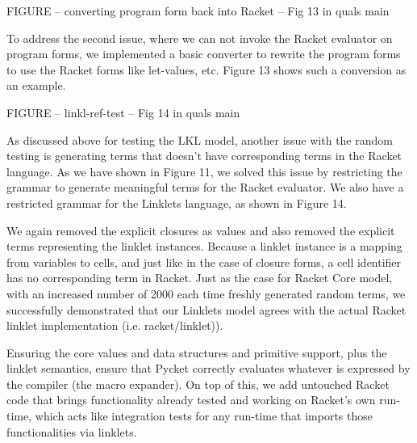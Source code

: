			\begin{figure-here}
				FIGURE -- converting program form back into Racket -- Fig 13 in quals main
			\end{figure-here}

			\begin{paragraph-here}%
				To address the second issue, where we can not invoke the Racket evaluator on program forms, we implemented a basic converter to rewrite the program forms to use the Racket forms like let-values, etc. Figure 13 shows such a conversion as an example.

			\end{paragraph-here}

			\begin{figure-here}
				 FIGURE -- linkl-ref-test -- Fig 14 in quals main
			\end{figure-here}

			\begin{paragraph-here}%
				As discussed above for testing the LKL model, another issue with the random testing is generating terms that doesn’t have corresponding terms in the Racket language. As we have shown in Figure 11, we solved this issue by restricting the grammar to generate meaningful terms for the Racket evaluator. We also have a restricted grammar for the Linklets language, as shown in Figure 14.
			\end{paragraph-here}

			\begin{paragraph-here}%
				We again removed the explicit closures as values and also removed the explicit terms representing the linklet instances. Because a linklet instance is a mapping from variables to cells, and just like in the case of closure forms, a cell identifier has no corresponding term in Racket. Just as the case for Racket Core model, with an increased number of 2000 each time freshly generated random terms, we successfully demonstrated that our Linklets model agrees with the actual Racket linklet implementation (i.e. racket/linklet)).
			\end{paragraph-here}

			\begin{paragraph-here}%
				Ensuring the core values and data structures and primitive support, plus the linklet semantics, ensure that Pycket correctly evaluates whatever is expressed by the compiler (the macro expander). On top of this, we add untouched Racket code that brings functionality already tested and working on Racket's own run-time, which acts like integration tests for any run-time that imports those functionalities via linklets.
			\end{paragraph-here}



